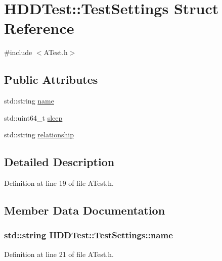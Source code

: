\hypertarget{struct_h_d_d_test_1_1_test_settings}{\section{H\-D\-D\-Test\-:\-:Test\-Settings Struct Reference}
\label{struct_h_d_d_test_1_1_test_settings}
}


{\ttfamily \#include $<$A\-Test.\-h$>$}

\subsection*{Public Attributes}
\begin{DoxyCompactItemize}
\item 
std\-::string \hyperlink{struct_h_d_d_test_1_1_test_settings_acb1acd81644b7dc295e3cfd187469cb9}{name}
\item 
std\-::uint64\-\_\-t \hyperlink{struct_h_d_d_test_1_1_test_settings_a689e6ed46e39f14544a7f257c506d9b9}{sleep}
\item 
std\-::string \hyperlink{struct_h_d_d_test_1_1_test_settings_a2ae4bf77f3d9d63cc28ac44622327d23}{relationship}
\end{DoxyCompactItemize}


\subsection{Detailed Description}


Definition at line 19 of file A\-Test.\-h.



\subsection{Member Data Documentation}
\hypertarget{struct_h_d_d_test_1_1_test_settings_acb1acd81644b7dc295e3cfd187469cb9}{
\subsubsection[{name}]{\setlength{\rightskip}{0pt plus 5cm}std\-::string H\-D\-D\-Test\-::\-Test\-Settings\-::name}}\label{struct_h_d_d_test_1_1_test_settings_acb1acd81644b7dc295e3cfd187469cb9}


Definition at line 21 of file A\-Test.\-h.

